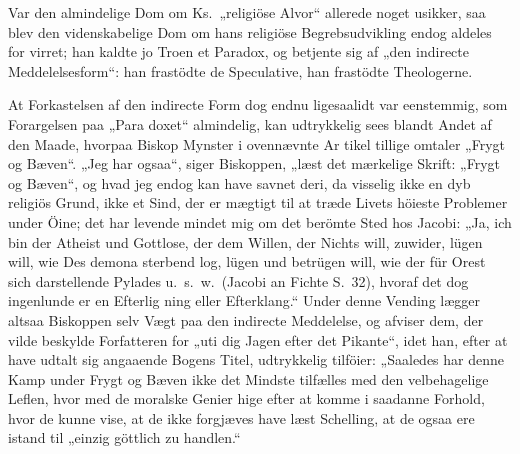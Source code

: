 \documentclass[12pt,a4paper]{article}
\newcommand{\opage}[1]{\marginnote{\footnotesize\textit{[#1]}}}
\begin{document}
Var den almindelige Dom om Ks.\ „religiöse Alvor“
allerede noget usikker, saa blev den videnskabelige Dom
om hans religiöse Begrebsudvikling endog aldeles for\-%
virret; han kaldte jo Troen et Paradox, og betjente sig
af „den indirecte Meddelelsesform“: han frastödte de
Speculative, han frastödte Theologerne.

At Forkastelsen af den indirecte Form dog endnu
ligesaalidt var eenstemmig, som Forargelsen paa „Para\-%
doxet“ almindelig, kan udtrykkelig sees blandt Andet af
den Maade, hvorpaa Biskop Mynster i ovennævnte Ar\-%
tikel tillige omtaler „Frygt og Bæven“. „Jeg har ogsaa“,
siger Biskoppen, „læst det mærkelige Skrift: „Frygt og
Bæven“, og hvad jeg endog kan have savnet deri, da
visselig ikke en dyb religiös Grund, ikke et Sind, der
er mægtigt til at træde Livets höieste Problemer under
Öine; det har levende mindet mig om det berömte Sted
hos Jacobi: „Ja, ich bin der Atheist und Gottlose, der
dem Willen, der Nichts will, zuwider, lügen will, wie Des\-%
demona sterbend log, lügen und betrügen will, wie der
für Orest sich darstellende Pylades u.\ s.\ w.\ (Jacobi an
Fichte S.\ 32), hvoraf det dog ingenlunde er en Efterlig\-%
ning eller Efterklang.“ Under denne Vending lægger
altsaa Biskoppen selv Vægt paa den indirecte Meddelelse,
og afviser dem, der vilde beskylde Forfatteren for „uti\-%
dig Jagen efter det Pikante“, idet han, efter at have
udtalt sig angaaende Bogens Titel, udtrykkelig tilföier:
„Saaledes har denne Kamp under Frygt og Bæven ikke
det Mindste tilfælles med den velbehagelige Leflen, hvor\-%
med de moralske Genier hige efter at komme i saadanne
Forhold, hvor de kunne vise, at de ikke forgjæves have
\opage{7} %
læst Schelling, at de ogsaa ere istand til „einzig göttlich
zu handlen.“
\end{document}

